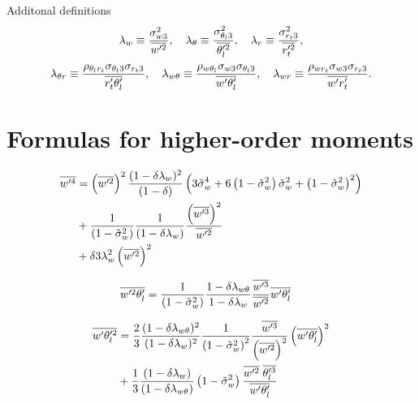 \documentclass[10pt]{beamer}
\numberwithin{equation}{section}
\begin{document}
    \begin{frame}{Additonal definitions}
        \begin{align}
            \label{eq:lambda}
            \lambda_w \equiv \frac{\sigma_{w 3}^2}{\overline{w'^2}}, \quad
            \lambda_\theta \equiv \frac{\sigma_{\theta_l 3}^2}{\overline{\theta_l'^2}}, \quad
            \lambda_r \equiv \frac{\sigma_{r_t 3}^2}{\overline{r_t'^2}},
        \end{align}
        \begin{align}
            \label{eq:lambda_two}
            \lambda_{\theta r} \equiv
            \frac{\rho_{\theta_l r_t} \sigma_{\theta_l 3} \sigma_{r_t 3}}{\overline{r_t' \theta_l'}}, \quad
            \lambda_{w \theta} \equiv
            \frac{\rho_{w \theta_l} \sigma_{w 3} \sigma_{\theta_l 3}}{\overline{w' \theta_l'}}, \quad
            \lambda_{w r} \equiv
            \frac{\rho_{w r_t} \sigma_{w 3} \sigma_{r_t 3}}{\overline{w' r_t'}}.
        \end{align}
    \end{frame}


    \section{Formulas for higher-order moments}\label{sec:formulas-for-higher-order-moments}

    \begin{frame}
        \begin{align}
            \label{eq:wp4}
            \overline{w'^4}
            &= \left(\overline{w'^2}\right)^2
            \frac{(1-\delta \lambda_w)^2}{(1-\delta)}
            \left(3 {\tilde{\sigma}_w}^4 + 6 \left( 1 - \tilde{\sigma}_w^2 \right) {\tilde{\sigma}_w}^2 + \left( 1 - \tilde{\sigma}_w^2 \right)^2\right) \nonumber\\
            &+ \frac{1}{\left( 1 - \tilde{\sigma}_w^2 \right)} \frac{1}{(1-\delta \lambda_w)}
            \frac{\left(\overline{w'^3}\right)^2}{\overline{w'^2}} \nonumber\\
            &+ \delta 3 \lambda_w^2 \left(\overline{w'^2}\right)^2
        \end{align}
    \end{frame}

    \begin{frame}
        \begin{align}
            \label{eq:wp2thlp_solved}
            \overline{w'^2 \theta_l'}
            &= \frac{1}{\left( 1 - \tilde{\sigma}_w^2 \right)} \frac{1 - \delta \lambda_{w\theta}}{1-\delta \lambda_w} \frac{\overline{w'^3}}{\overline{w'^2}} \overline{w' \theta_l'}
        \end{align}
    \end{frame}

    \begin{frame}
        \begin{align}
            \label{eq:wpthlp2_solved}
            \overline{w' \theta_l'^2}
            &= \frac{2}{3} \frac{(1-\delta \lambda_{w \theta})^2}{(1-\delta \lambda_w)^2} \frac{1}{\left( 1 - \tilde{\sigma}_w^2 \right)^2} \frac{\overline{w'^3}}{\left(\overline{w'^2} \right)^2} \left(\overline{w' \theta_l'} \right)^2 \nonumber\\
            &+ \frac{1}{3} \frac{(1-\delta \lambda_w)}{(1-\delta \lambda_{w \theta})} \left( 1 - \tilde{\sigma}_w^2 \right) \frac{\overline{w'^2} \; \overline{\theta_l'^3}}{\overline{w' \theta_l'}}
        \end{align}
    \end{frame}
\end{document}

